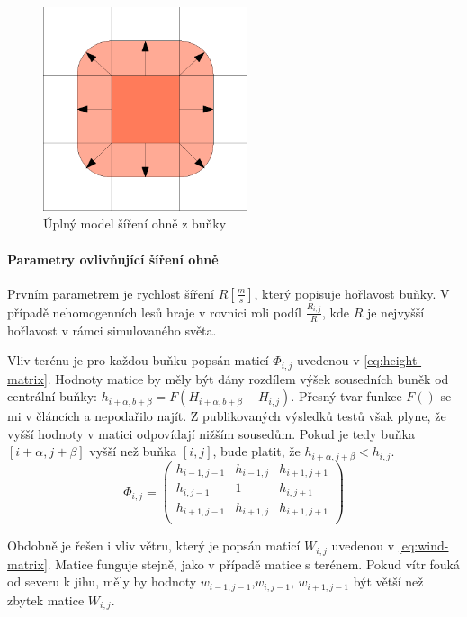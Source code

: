 \documentclass[11pt,a4paper]{scrartcl}
\begin{document}
	\begin{figure}[H]
		\centering
		\includegraphics[width=6cm]{model-full-spread}
		\caption{Úplný model šíření ohně z buňky}
		\label{fig:full-model}
	\end{figure}
	
	\paragraph{Parametry ovlivňující šíření ohně} Prvním parametrem je rychlost šíření $R [\frac{m}{s}]$, který popisuje hořlavost buňky. V případě nehomogenních lesů hraje v rovnici roli podíl $\frac{R_{i,j}}{R}$, kde $R$ je nejvyšší hořlavost v rámci simulovaného světa.
	
	Vliv terénu je pro každou buňku popsán maticí $\Phi_{i,j}$ uvedenou v \ref{eq:height-matrix}. Hodnoty matice by měly být dány rozdílem výšek sousedních buněk od centrální buňky: $h_{i+\alpha,b+\beta} = F(H_{i+\alpha,b+\beta} - H_{i,j})$. Přesný tvar funkce $F()$ se mi v článcích \cite{source_article} a \cite{old_model_art} nepodařilo najít. Z publikovaných výsledků testů však plyne, že vyšší hodnoty v matici odpovídají nižším sousedům. Pokud je tedy buňka $[i+\alpha, j+\beta]$ vyšší než buňka $[i,j]$, bude platit, že $h_{i+\alpha, j+\beta} < h_{i,j}$.
\begin{equation}
	\Phi_{i,j} =
	\begin{pmatrix}
	h_{i-1,j-1}       & h_{i-1,j} & h_{i+1,j+1} \\
	h_{i,j-1}       & 1 & h_{i,j+1} \\
	h_{i+1,j-1}       & h_{i+1,j} & h_{i+1,j+1} \\
	\end{pmatrix}
	\label{eq:height-matrix}
\end{equation}	
	
	Obdobně je řešen i vliv větru, který je popsán maticí $W_{i,j}$ uvedenou v \ref{eq:wind-matrix}. Matice funguje stejně, jako v případě matice s terénem. Pokud vítr fouká od severu k jihu, měly by hodnoty $w_{i-1,j-1}$,$w_{i,j-1}$, $w_{i+1,j-1}$ být větší než zbytek matice $W_{i,j}$.
	
\end{document}
